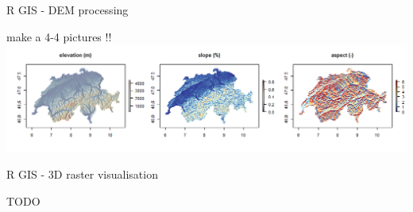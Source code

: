\documentclass[8pt,ignorenonframetext,]{beamer}
\newcommand{\columnsend}{\end{columns}}
\begin{document}

\begin{frame}{R GIS - DEM processing}

make a 4-4 pictures !! \includegraphics{imgPres/R_GIS01.png}

\end{frame}

\begin{frame}{R GIS - 3D raster visualisation}

TODO

\end{frame}
\end{document}
